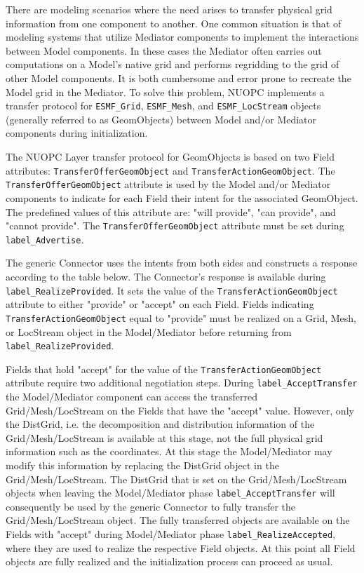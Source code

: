 %

\label{TransferGeom}

There are modeling scenarios where the need arises to transfer physical grid information from one component to another. One common situation is that of modeling systems that utilize Mediator components to implement the interactions between Model components. In these cases the Mediator often carries out computations on a Model's native grid and performs regridding to the grid of other Model components. It is both cumbersome and error prone to recreate the Model grid in the Mediator. To solve this problem, NUOPC implements a transfer protocol for {\tt ESMF\_Grid}, {\tt ESMF\_Mesh}, and {\tt ESMF\_LocStream} objects (generally referred to as GeomObjects) between Model and/or Mediator components during initialization.

The NUOPC Layer transfer protocol for GeomObjects is based on two Field attributes: {\tt TransferOfferGeomObject} and {\tt TransferActionGeomObject}. The {\tt TransferOfferGeomObject} attribute is used by the Model and/or Mediator components to indicate for each Field their intent for the associated GeomObject. The predefined values of this attribute are: "will provide", "can provide", and "cannot provide". The {\tt TransferOfferGeomObject} attribute must be set during {\tt label\_Advertise}.

The generic Connector uses the intents from both sides and constructs a response according to the table below. The Connector's response is available during {\tt label\_RealizeProvided}. It sets the value of the {\tt TransferActionGeomObject} attribute to either "provide" or "accept" on each Field. Fields indicating {\tt TransferActionGeomObject} equal to "provide" must be realized on a Grid, Mesh, or LocStream object in the Model/Mediator before returning from {\tt label\_RealizeProvided}.

Fields that hold "accept" for the value of the {\tt TransferActionGeomObject} attribute require two additional negotiation steps. During {\tt label\_AcceptTransfer} the Model/Mediator component can access the transferred Grid/Mesh/LocStream on the Fields that have the "accept" value. However, only the DistGrid, i.e. the decomposition and distribution information of the Grid/Mesh/LocStream is available at this stage, not the full physical grid information such as the coordinates. At this stage the Model/Mediator may modify this information by replacing the DistGrid object in the Grid/Mesh/LocStream. The DistGrid that is set on the Grid/Mesh/LocStream objects when leaving the Model/Mediator phase {\tt label\_AcceptTransfer} will consequently be used by the generic Connector to fully transfer the Grid/Mesh/LocStream object. The fully transferred objects are available on the Fields with "accept" during Model/Mediator phase {\tt label\_RealizeAccepted}, where they are used to realize the respective Field objects. At this point all Field objects are fully realized and the initialization process can proceed as usual.

